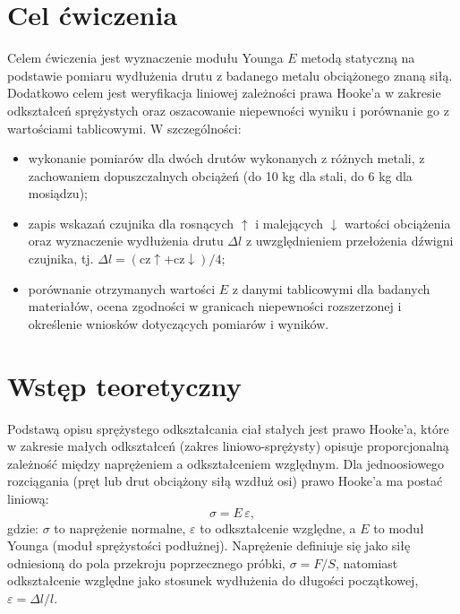 \documentclass{fizykalab}
\begin{document}
\maketitle

\section{Cel ćwiczenia}

Celem ćwiczenia jest wyznaczenie modułu Younga \(E\) metodą statyczną
na podstawie pomiaru wydłużenia drutu z badanego metalu obciążonego
znaną siłą. Dodatkowo celem jest weryfikacja liniowej zależności prawa
Hooke'a w zakresie odkształceń sprężystych oraz oszacowanie niepewności
wyniku i porównanie go z wartościami tablicowymi. W szczególności:

\begin{itemize}
  \item wykonanie pomiarów dla dwóch drutów wykonanych z różnych metali,
    z zachowaniem dopuszczalnych obciążeń (do 10 kg dla stali, do 6 kg dla mosiądzu);
  \item zapis wskazań czujnika dla rosnących \(\uparrow\) i malejących
    \(\downarrow\) wartości obciążenia oraz wyznaczenie wydłużenia
    drutu \(\Delta l\) z uwzględnieniem przełożenia dźwigni czujnika,
    tj. \(\Delta l = (\text{cz} \uparrow + \text{cz} \downarrow)/4\);
  \item porównanie otrzymanych wartości \(E\) z danymi tablicowymi dla
    badanych materiałów, ocena zgodności w granicach niepewności
    rozszerzonej i określenie wniosków dotyczących pomiarów i wyników.
\end{itemize}

\section{Wstęp teoretyczny}

Podstawą opisu sprężystego odkształcania ciał stałych jest prawo Hooke'a,
które w zakresie małych odkształceń (zakres liniowo-sprężysty) opisuje
proporcjonalną zależność między naprężeniem a odkształceniem względnym.
Dla jednoosiowego rozciągania (pręt lub drut obciążony siłą wzdłuż osi)
prawo Hooke'a ma postać liniową:
$$
\sigma = E\,\varepsilon,
$$
gdzie: \( \sigma \) to naprężenie normalne, \( \varepsilon \) to
odkształcenie względne, a \( E \) to moduł Younga (moduł sprężystości
podłużnej). Naprężenie definiuje się jako siłę odniesioną do pola
przekroju poprzecznego próbki,
\( \sigma = F/S \), natomiast odkształcenie względne jako stosunek
wydłużenia do długości początkowej,
\( \varepsilon = \Delta l / l \).
\end{document}

